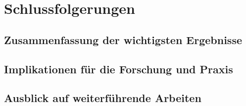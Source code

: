 \section{Schlussfolgerungen}

\subsection{Zusammenfassung der wichtigsten Ergebnisse}

\subsection{Implikationen für die Forschung und Praxis}

\subsection{Ausblick auf weiterführende Arbeiten}